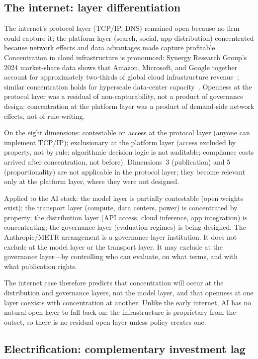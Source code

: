 \subsection{The internet: layer differentiation}

The internet's protocol layer (TCP/IP, DNS) remained open because no firm could capture it; the platform layer (search, social, app distribution) concentrated because network effects and data advantages made capture profitable. Concentration in cloud infrastructure is pronounced: Synergy Research Group's 2024 market-share data shows that Amazon, Microsoft, and Google together account for approximately two-thirds of global cloud infrastructure revenue~\cite{synergy2024}; similar concentration holds for hyperscale data-center capacity~\cite{dcbyte2024}. Openness at the protocol layer was a residual of non-capturability, not a product of governance design; concentration at the platform layer was a product of demand-side network effects, not of rule-writing.

On the eight dimensions: contestable on access at the protocol layer (anyone can implement TCP/IP); exclusionary at the platform layer (access excluded by property, not by rule; algorithmic decision logic is not auditable; compliance costs arrived after concentration, not before). Dimensions~3 (publication) and 5 (proportionality) are not applicable in the protocol layer; they become relevant only at the platform layer, where they were not designed.

Applied to the AI stack: the model layer is partially contestable (open weights exist); the transport layer (compute, data centers, power) is concentrated by property; the distribution layer (API access, cloud inference, app integration) is concentrating; the governance layer (evaluation regimes) is being designed. The Anthropic/METR arrangement is a governance-layer institution. It does not exclude at the model layer or the transport layer. It may exclude at the governance layer---by controlling who can evaluate, on what terms, and with what publication rights.

The internet case therefore predicts that concentration will occur at the distribution and governance layers, not the model layer, and that openness at one layer coexists with concentration at another. Unlike the early internet, AI has no natural open layer to fall back on: the infrastructure is proprietary from the outset, so there is no residual open layer unless policy creates one.

\subsection{Electrification: complementary investment lag}

